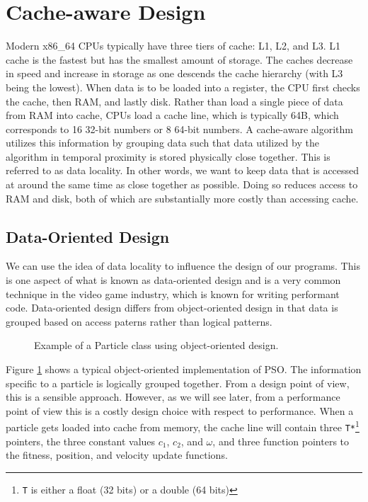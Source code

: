 \section{Cache-aware Design}\label{sec:cache}
Modern x86\_64 CPUs typically have three tiers of cache: L1, L2, and
L3. L1 cache is the fastest but has the smallest amount of storage. The caches
decrease in speed and increase in storage as one descends the cache
hierarchy (with L3 being the lowest). When data is to be loaded into a register,
the CPU first checks the
cache, then RAM, and lastly disk. Rather than load a single piece of data from
RAM into cache, CPUs load a cache line, which is typically 64B, which
corresponds to 16 32-bit numbers or 8 64-bit numbers. A cache-aware
algorithm utilizes this information by grouping data such that data utilized by
the algorithm in temporal proximity is stored physically close together. This
is referred to as data locality. In other words, we want to keep data that is
accessed at around the same time as close together as possible. Doing so reduces
access to RAM and disk, both of which are substantially more
costly than accessing cache.

\subsection{Data-Oriented Design}
We can use the idea of data locality to
influence the design of our programs. This is one aspect of what is known as
data-oriented design and
is a very common technique in the video game industry, which is known for
writing performant code.
Data-oriented design
differs from object-oriented design in that data is grouped based on access
paterns rather than logical patterns.

\begin{figure}
  
  \caption{Example of a Particle class using object-oriented
    design.}\label{fig:particle}
\end{figure}

Figure \ref{fig:particle} shows a typical object-oriented implementation of PSO.
The information specific to a particle is logically grouped together. From a
design point of view, this is a sensible approach. However, as we will see
later, from a performance point of view this is a costly design choice with
respect to performance.
When a particle gets loaded into cache from memory, the
cache line will contain three \texttt{T*}\footnote{\texttt{T} is either a float
  (32 bits) or a double (64 bits)} pointers, the three constant values
$c_1$, $c_2$, and $\omega$, and three function pointers to the fitness,
position, and velocity update functions.

